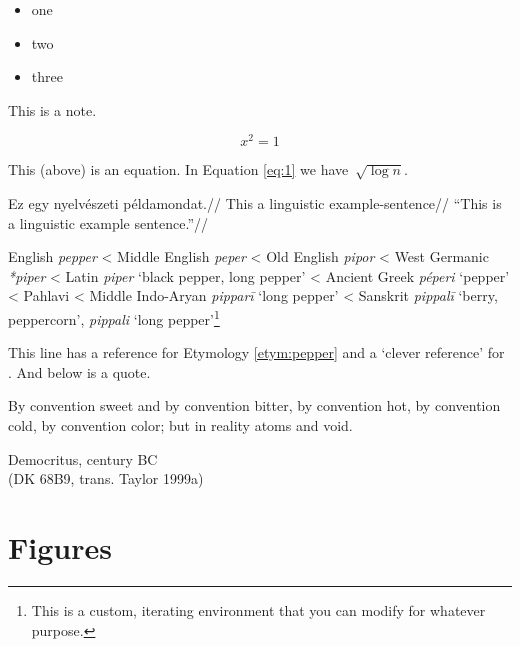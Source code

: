 \begin{itemize}
    \item one
    \item two
    \item three
\end{itemize}

\begin{note}
    This is a note.
\end{note}

\begin{equation}
    \label{eq:1}
    x^2  = 1
\end{equation}

This (above) is an equation. In Equation \ref{eq:1} we have~$\sqrt{\log n}$.

\ex
\begingl
\gla{}Ez egy nyelvészeti példamondat.//
\glb This a linguistic example-sentence//
\glft ``This is a linguistic example sentence.''//
\endgl
\xe

\begin{etymology}\label{etym:pepper}
\raggedright
English \textit{pepper}
< Middle English \textit{peper}
< Old English \textit{pipor}
< West Germanic \textit{*piper}
< Latin \textit{piper} `black pepper, long pepper'
< Ancient Greek \textit{péperi} `pepper'
< Pahlavi
< Middle Indo-Aryan \textit{pipparī} `long pepper'
< Sanskrit \textit{pippalī} `berry, peppercorn', \textit{pippali} `long pepper'\footnote{This is a custom, iterating environment that you can modify for whatever purpose.}
\end{etymology}

This line has a reference for Etymology \ref{etym:pepper} and a `clever reference' for . And below is a quote.

\epigraph{By convention sweet and by convention bitter, by convention hot, by convention cold, by convention color; but in reality atoms and void.}{Democritus,  century BC\\(DK 68B9, trans. Taylor 1999a)}

\blindtext

\section{Figures}


